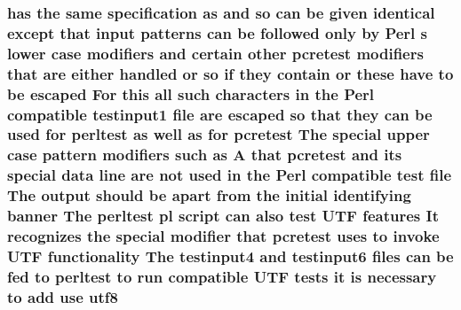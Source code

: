 \subsubsection[{\texorpdfstring{utf8}{utf8}}]{ has the same specification {\bf as} and {\bf so} {\bf can} {\bf be} {\bf given} {\bf identical} {\bf except} that {\bf input} {\bf patterns} {\bf can} {\bf be} followed only by {\bf Perl} {\bf s} lower {\bf case} {\bf modifiers} and certain other {\bf pcretest} {\bf modifiers} that {\bf are} either handled {\bf or} {\bf so} {\bf if} they contain {\bf or} these have {\bf to} {\bf be} escaped For {\bf this} {\bf all} such {\bf characters} {\bf in} the {\bf Perl} compatible testinput1 {\bf file} {\bf are} escaped {\bf so} that they {\bf can} {\bf be} {\bf used} for perltest {\bf as} well {\bf as} for {\bf pcretest} The {\bf special} {\bf upper} {\bf case} {\bf pattern} {\bf modifiers} such {\bf as} {\bf A} that {\bf pcretest} and its {\bf special} {\bf data} {\bf line} {\bf are} {\bf not} {\bf used} {\bf in} the {\bf Perl} compatible test {\bf file} The {\bf output} should {\bf be} apart {\bf from} the initial identifying banner The perltest {\bf pl} {\bf script} {\bf can} also test U\+TF {\bf features} It {\bf recognizes} the {\bf special} {\bf modifier} that {\bf pcretest} uses {\bf to} invoke U\+TF functionality The testinput4 and testinput6 {\bf files} {\bf can} {\bf be} fed {\bf to} perltest {\bf to} {\bf run} compatible U\+TF {\bf tests} {\bf it} {\bf is} necessary {\bf to} add use utf8}\hypertarget{perltest_8txt_a03be0a31857a405ef505b6ab4ff308a4}{}\label{perltest_8txt_a03be0a31857a405ef505b6ab4ff308a4}
